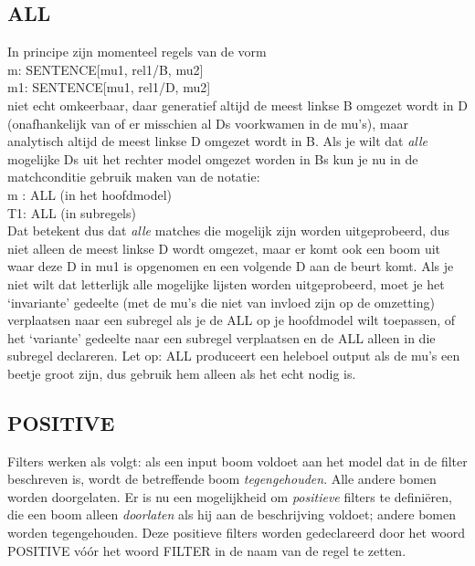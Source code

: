 \subsection{ALL}
In principe zijn momenteel regels van de vorm \\
m: SENTENCE{}[mu1, rel1/B, mu2] \\
m1: SENTENCE{}[mu1, rel1/D, mu2]\\
niet echt omkeerbaar, daar generatief altijd de meest linkse B omgezet wordt in 
D (onafhankelijk van of er misschien al Ds voorkwamen in de mu's), maar 
analytisch altijd de meest linkse D omgezet wordt in B. Als je wilt dat 
{\em alle\/} mogelijke Ds uit het 
rechter model omgezet worden in Bs kun je nu in de matchconditie gebruik maken 
van de notatie:\\
m : ALL (in het hoofdmodel)\\
T1: ALL (in subregels)\\
Dat betekent dus dat {\em alle\/} matches die mogelijk zijn worden 
uitgeprobeerd, dus niet alleen de meest linkse D wordt omgezet, maar er komt 
ook een boom uit waar deze D in mu1 is opgenomen en een volgende D aan de beurt 
komt. Als je niet wilt dat letterlijk alle mogelijke lijsten worden 
uitgeprobeerd, moet je het `invariante' gedeelte (met de mu's die niet van 
invloed zijn op de omzetting) verplaatsen naar een subregel 
als je de ALL op je hoofdmodel wilt toepassen, of het `variante' gedeelte naar 
een subregel verplaatsen en de ALL alleen in die subregel declareren.
Let op: ALL produceert een heleboel output als de mu's een beetje groot zijn, 
dus gebruik hem alleen als het echt nodig is.

\subsection{POSITIVE}
Filters werken als volgt: als een input boom voldoet aan het model dat in de 
filter beschreven is, wordt de betreffende boom {\em tegengehouden\/}. Alle 
andere bomen 
worden doorgelaten. Er is nu een mogelijkheid om {\em positieve\/} filters 
te defini\"{e}ren, die een boom alleen {\em doorlaten\/} als hij aan de 
beschrijving voldoet; andere bomen worden tegengehouden. Deze positieve filters 
worden gedeclareerd door het woord POSITIVE v\'{o}\'{o}r het woord FILTER in de 
naam van de regel te zetten.

